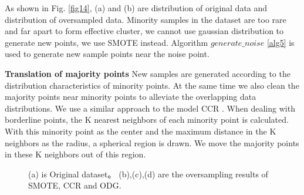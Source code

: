 \documentclass[ida]{iosart2x}
\begin{document}
As shown in Fig. \ref{fig14}, (a) and (b) are distribution of original data and 
distribution of oversampled data.
Minority samples in the dataset are too rare and far apart to form effective cluster, we cannot use
gaussian distribution to generate new points, we use SMOTE instead.
Algorithm $generate\_noise$ \ref{alg5} is used to generate new sample points near the noise point.

\textbf{Translation of majority points}
New samples are generated according to the 
distribution characteristics of minority points. 
At the same time we also clean the majority points
 near minority points to alleviate the overlapping data distributions.
We use a similar approach to the model CCR \cite{2017CCR}.
When dealing with borderline points, 
the K nearest neighbors of each minority point is calculated. 
With this minority point as the center and the maximum distance in the K neighbors as the radius, 
a spherical region is drawn. We move the majority points in these K neighbors out of this region.

\begin{figure}[tb]
  \centering
  \quad
  \quad
  \quad
  \caption{(a) is Original dataset。
  (b),(c),(d) are the oversampling results of SMOTE, CCR and ODG.}
  \label{fig18}
  \end{figure}
\end{document}
